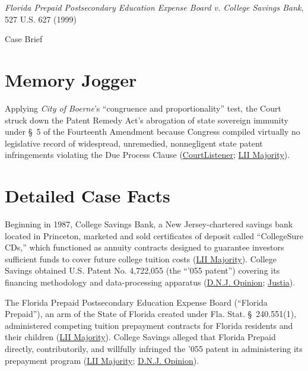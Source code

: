 \documentclass[12pt]{article}
\begin{document}
\begin{center}
{\LARGE \textit{Florida Prepaid Postsecondary Education Expense Board v. College Savings Bank}, 527 U.S. 627 (1999)\par}
\vspace{0.8em}
{\large Case Brief\par}
\end{center}
\vspace{1em}

\section{Memory Jogger}

Applying \textit{City of Boerne}'s ``congruence and proportionality'' test, the Court struck down the Patent Remedy Act's abrogation of state sovereign immunity under \S~5 of the Fourteenth Amendment because Congress compiled virtually no legislative record of widespread, unremedied, nonnegligent state patent infringements violating the Due Process Clause (\href{https://www.courtlistener.com/opinion/118316/florida-prepaid-postsecondary-education-expense-board-v-college-savings/}{CourtListener}; \href{https://www.law.cornell.edu/supct/html/98-531.ZO.html}{LII Majority}).

\section{Detailed Case Facts}

Beginning in 1987, College Savings Bank, a New Jersey-chartered savings bank located in Princeton, marketed and sold certificates of deposit called ``CollegeSure CDs,'' which functioned as annuity contracts designed to guarantee investors sufficient funds to cover future college tuition costs (\href{https://www.law.cornell.edu/supct/html/98-531.ZO.html}{LII Majority}). College Savings obtained U.S. Patent No. 4,722,055 (the ``'055 patent'') covering its financing methodology and data-processing apparatus (\href{https://law.justia.com/cases/federal/district-courts/FSupp/948/400/2098999/}{D.N.J. Opinion}; \href{https://law.justia.com/cases/federal/district-courts/FSupp/919/756/1581067/}{Justia}).

The Florida Prepaid Postsecondary Education Expense Board (``Florida Prepaid''), an arm of the State of Florida created under Fla. Stat. \S~240.551(1), administered competing tuition prepayment contracts for Florida residents and their children (\href{https://www.law.cornell.edu/supct/html/98-531.ZO.html}{LII Majority}). College Savings alleged that Florida Prepaid directly, contributorily, and willfully infringed the '055 patent in administering its prepayment program (\href{https://www.law.cornell.edu/supct/html/98-531.ZO.html}{LII Majority}; \href{https://law.justia.com/cases/federal/district-courts/FSupp/948/400/2098999/}{D.N.J. Opinion}).
\end{document}
